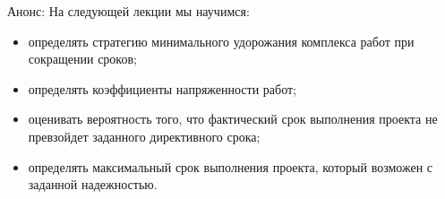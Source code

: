 \documentclass[unicode,11pt,notheorems]{beamer}
\begin{document}
\begin{frame}{Анонс:}
	На следующей лекции мы научимся:
	\begin{itemize}
	\item 
		определять стратегию минимального удорожания комплекса работ при сокращении  сроков;
	\item 
		определять коэффициенты напряженности работ;
	\item 
		оценивать вероятность того, что фактический срок выполнения проекта не превзойдет заданного директивного срока;
	\item 
		определять максимальный срок выполнения проекта, который возможен с заданной надежностью.	
	\end{itemize}

\end{frame}
\end{document}
